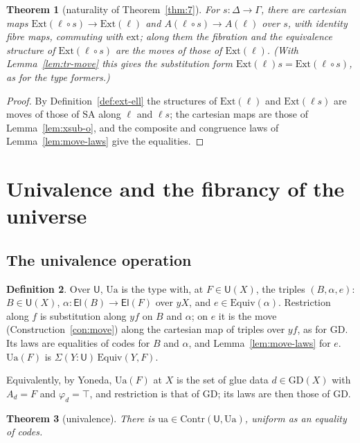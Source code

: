 \documentclass[11pt]{article}
\newcommand{\U}{\mathsf{U}}
\newcommand{\El}{\mathsf{El}}
\newcommand{\Ext}{\mathrm{Ext}}
\newcommand{\ext}{\mathrm{ext}}
\newcommand{\Contr}{\mathrm{Contr}}
\newcommand{\Equiv}{\mathrm{Equiv}}
\newcommand{\GD}{\mathrm{GD}}
\newcommand{\SA}{\mathrm{SA}}
\newcommand{\Ua}{\mathrm{Ua}}
\newcommand{\ua}{\mathrm{ua}}
\theoremstyle{plain}
\newtheorem{theorem}{Theorem}[section]
\theoremstyle{definition}
\newtheorem{definition}[theorem]{Definition}
\theoremstyle{remark}
\begin{document}
\begin{theorem}[naturality of Theorem~\ref{thm:7}]\label{thm:7-nat}
For $s:\Delta\to\Gamma$, there are cartesian maps
$\Ext(\ell\circ s)\to\Ext(\ell)$ and $A(\ell\circ s)\to A(\ell)$ over $s$,
with identity fibre maps, commuting with $\ext$; along them the
fibration and the equivalence structure of $\Ext(\ell\circ s)$ are the
moves of those of $\Ext(\ell)$. (With Lemma~\ref{lem:tr-move} this gives
the substitution form $\Ext(\ell)s=\Ext(\ell\circ s)$, as for the type
formers.)
\end{theorem}

\begin{proof}
By Definition~\ref{def:ext-ell} the structures of $\Ext(\ell)$ and
$\Ext(\ell s)$ are moves of those of $\SA$ along $\ell$ and $\ell s$; the
cartesian maps are those of Lemma~\ref{lem:xsub-o}, and the composite and
congruence laws of Lemma~\ref{lem:move-laws} give the equalities.
\end{proof}

\section{Univalence and the fibrancy of the universe}\label{sec:ua}

\subsection{The univalence operation}

\begin{definition}
Over $\U$, $\Ua$ is the type with, at $F\in\U(X)$, the triples
$(B,\alpha,e)$: $B\in\U(X)$, $\alpha:\El(B)\to\El(F)$ over $yX$, and
$e\in\Equiv(\alpha)$. Restriction along $f$ is substitution along $yf$
on $B$ and $\alpha$; on $e$ it is the move (Construction~\ref{con:move})
along the cartesian map of triples over $yf$, as for $\GD$. Its laws are
equalities of codes for $B$ and $\alpha$, and Lemma~\ref{lem:move-laws}
for $e$. $\Ua(F)$ is $\Sigma(Y:\U)\,\Equiv(Y,F)$.

Equivalently, by Yoneda, $\Ua(F)$ at $X$ is the set of glue data
$d\in\GD(X)$ with $A_d=F$ and $\varphi_d=\top$, and restriction is that
of $\GD$; its laws are then those of $\GD$.
\end{definition}

\begin{theorem}[univalence]\label{thm:ua}
There is $\ua\in\Contr(\U,\Ua)$, uniform as an equality of codes.
\end{theorem}
\end{document}
